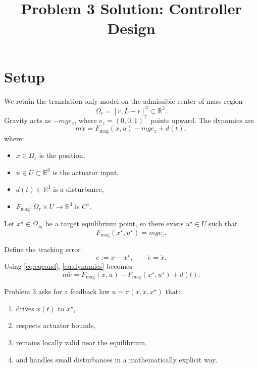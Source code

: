 \documentclass[11pt]{article}
\title{\textbf{Problem 3 Solution: Controller Design}}
\author{}
\date{}
\theoremstyle{definition}
\begin{document}
\maketitle

\section{Setup}

We retain the translation-only model on the admissible center-of-mass region
\[
\Omega_r = [r,L-r]^3 \subset \mathbb{R}^3.
\]
Gravity acts as $-mg e_z$, where $e_z = (0,0,1)^\top$ points upward. The dynamics are
\begin{equation}
 m\ddot x = F_{\mathrm{mag}}(x,u) - mg e_z + d(t),
 \label{eq:dynamics}
\end{equation}
where:
\begin{itemize}[leftmargin=1.5em]
    \item $x \in \Omega_r$ is the position,
    \item $u \in U \subset \mathbb{R}^6$ is the actuator input,
    \item $d(t) \in \mathbb{R}^3$ is a disturbance,
    \item $F_{\mathrm{mag}} : \Omega_r \times U \to \mathbb{R}^3$ is $C^1$.
\end{itemize}

Let $x^\star \in \Omega_{\mathrm{eq}}$ be a target equilibrium point, so there exists $u^\star \in U$ such that
\begin{equation}
F_{\mathrm{mag}}(x^\star,u^\star) = mg e_z.
\label{eq:eqcond}
\end{equation}

Define the tracking error
\[
e := x - x^\star,
\qquad
\dot e = \dot x.
\]
Using \eqref{eq:eqcond}, \eqref{eq:dynamics} becomes
\begin{equation}
 m\ddot e = F_{\mathrm{mag}}(x,u) - F_{\mathrm{mag}}(x^\star,u^\star) + d(t).
 \label{eq:errordyn}
\end{equation}

Problem 3 asks for a feedback law $u = \pi(x,\dot x,x^\star)$ that:
\begin{enumerate}[label=\textbf{(\arabic*)}, leftmargin=1.5em]
    \item drives $x(t)$ to $x^\star$,
    \item respects actuator bounds,
    \item remains locally valid near the equilibrium,
    \item and handles small disturbances in a mathematically explicit way.
\end{enumerate}
\end{document}
